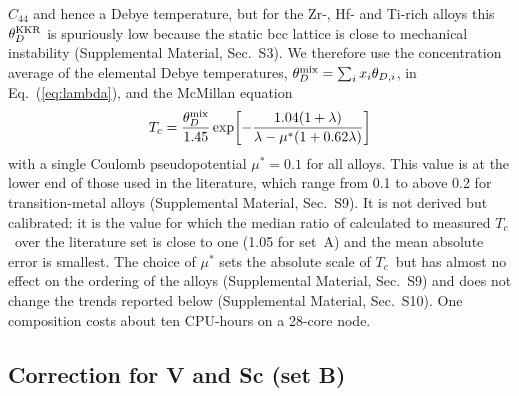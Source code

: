 \documentclass[aps,prb,reprint,superscriptaddress,twocolumn,floatfix]{revtex4-2}
\newcommand{\Tc}{$T_c$}
\newcommand{\SI}[1]{Supplemental Material, Sec.~#1}
\begin{document}
$C_{44}$ and hence a Debye temperature, but for the Zr-, Hf- and Ti-rich alloys this
$\theta_D^{\rm KKR}$ is spuriously low because the static bcc lattice is close to
mechanical instability (\SI{S3}). We therefore use the concentration average of the
elemental Debye temperatures, $\theta_D^{\rm mix} = \sum_i x_i \theta_{D,i}$, in
Eq.~(\ref{eq:lambda}), and the McMillan equation~\cite{McMillan1968}
\begin{equation}
  T_c = \frac{\theta_D^{\rm mix}}{1.45}
  \exp\!\left[-\frac{1.04(1+\lambda)}{\lambda - \mu^*(1+0.62\lambda)}\right]
  \label{eq:mcmillan}
\end{equation}
with a single Coulomb pseudopotential $\mu^* = 0.1$ for all alloys. This value is at the
lower end of those used in the literature, which range from 0.1 to above 0.2 for
transition-metal alloys (\SI{S9}). It is not derived but calibrated: it is the value for
which the median ratio of calculated to measured \Tc\ over the literature set is close to
one (1.05 for set~A) and the mean absolute error is smallest. The choice of $\mu^*$ sets the
absolute scale of \Tc\ but has almost no effect on the ordering of the alloys (\SI{S9}) and
does not change the trends reported below (\SI{S10}). One composition costs about ten CPU-hours on a 28-core node.

\subsection{Correction for V and Sc (set B)}
\label{sec:corr}
\end{document}
